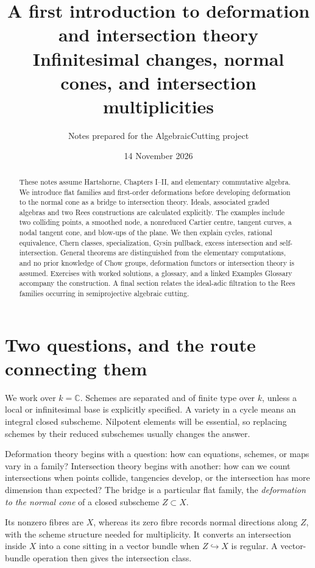 \documentclass[11pt,a4paper]{article}
\title{A first introduction to deformation and intersection theory\\[5pt]
\large Infinitesimal changes, normal cones, and intersection multiplicities}
\author{Notes prepared for the AlgebraicCutting project}
\date{14 November 2026}
\numberwithin{equation}{section}
\theoremstyle{definition}
\begin{document}
\maketitle
\begin{abstract}
These notes assume Hartshorne, Chapters I--II, and elementary commutative
algebra. We introduce flat families and first-order deformations before
developing deformation to the normal cone as a bridge to intersection
theory. Ideals, associated graded algebras and two Rees constructions are
calculated explicitly. The examples include two colliding points, a
smoothed node, a nonreduced Cartier centre, tangent curves, a nodal tangent
cone, and blow-ups of the plane. We then explain cycles, rational
equivalence, Chern classes, specialization, Gysin pullback, excess
intersection and self-intersection. General theorems are distinguished
from the elementary computations, and no prior knowledge of Chow groups,
deformation functors or intersection theory is assumed. Exercises with
worked solutions, a glossary, and a linked Examples Glossary accompany
the construction. A final section relates the ideal-adic filtration to
the Rees families occurring in semiprojective algebraic cutting.
\end{abstract}
\tableofcontents
\newpage

\section{Two questions, and the route connecting them}
\label{sec:roadmap}

We work over $k=\mathbb C$. Schemes are separated and of finite type over
$k$, unless a local or infinitesimal base is explicitly specified. A
variety in a cycle means an integral closed subscheme. Nilpotent elements
will be essential, so replacing schemes by their reduced subschemes
usually changes the answer.

Deformation theory begins with a question: how can equations, schemes,
or maps vary in a family? Intersection theory begins with another: how
can we count intersections when points collide, tangencies develop, or
the intersection has more dimension than expected? The bridge is a
particular flat family, the \emph{deformation to the normal cone} of a
closed subscheme $Z\subset X$.

Its nonzero fibres are $X$, whereas its zero fibre records normal
directions along $Z$, with the scheme structure needed for multiplicity.
It converts an intersection inside $X$ into a cone sitting in a vector
bundle when $Z\hookrightarrow X$ is regular. A vector-bundle operation
then gives the intersection class.
\end{document}
